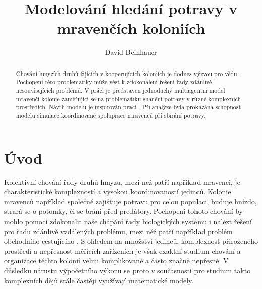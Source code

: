 \documentclass[10pt,a4paper,twocolumn]{article}
\begin{document}
\providecommand{\ShortAuthorList}[0]{David Beinhauer} %
\title{Modelování hledání potravy v mravenčích koloniích}
\author[1,*]{David Beinhauer}

\date{\dateline{}}

\begin{abstract}
\noindent
Chování hmyzích druhů žijících v kooperujících koloniích je dodnes 
výzvou pro vědu. Pochopení této problematiky může vést k zdokonalení řešení
řady zdánlivě nesouvisejících problémů. V práci je představen jednoduchý
multiagentní model mravenčí kolonie zaměřující se na problematiku shánění
potravy v různě komplexních prostředích. Návrh modelu je inspirován prací 
\citet{jones2010characteristics}. 
Při analýze byla prokázána schopnost modelu simulace koordinované 
spolupráce mravenců při sbírání potravy.


\DOI{} %
\end{abstract}

\maketitle
\thispagestyle{titlestyle}



\section{Úvod}

Kolektivní chování řady druhů hmyzu, mezi než patří například mravenci,
je charakteristické komplexností a vysokou koordinovaností jedinců. Kolonie
mravenců například společně zajišťuje potravu pro celou populaci, buduje hnízdo,
strará se o potomky, či se brání před predátory. Pochopení tohoto chování by
mohlo pomoci zdokonalit naše chápání řady biologických systému i nalézt
řešení pro řadu zdánlivě vzdálených problému, mezi něž
patří například problém obchodního cestujícího \citet{applegate2011traveling}. 
S ohledem na množství jedinců, komplexnost přirozeného prostředí a 
nepřesnost měřících zařízeních je však exaktní studium chování a 
organizace těchto kolonií velmi komplikované a 
často značně nepřesné. V důsledku nárustu výpočetního výkonu se proto v 
současnosti pro studium takto komplexních dějů stále častěji 
využívají matematické modely. 
\end{document}
